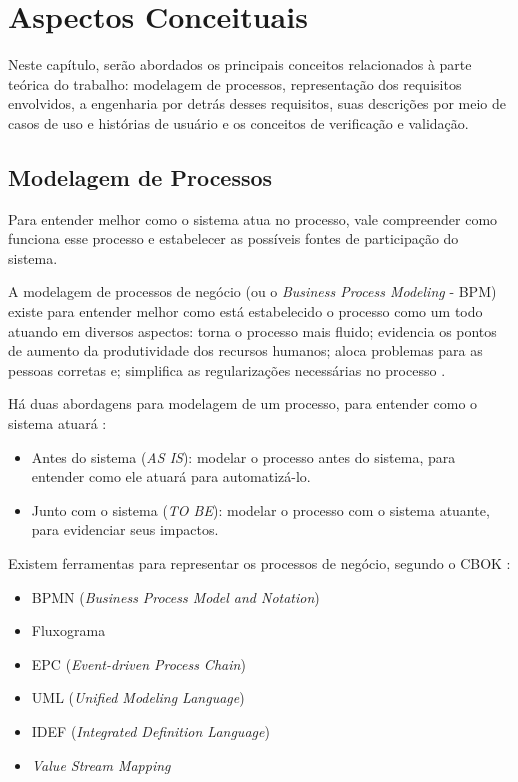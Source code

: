 \chapter{Aspectos Conceituais}\label{chap:aspectos-conceituais}
Neste capítulo, serão abordados os principais conceitos relacionados à parte teórica do trabalho: modelagem de processos, representação dos requisitos envolvidos, a engenharia por detrás desses requisitos, suas descrições por meio de casos de uso e histórias de usuário e os conceitos de verificação e validação.

\section{Modelagem de Processos}
Para entender melhor como o sistema atua no processo, vale compreender como funciona esse processo e estabelecer as possíveis fontes de participação do sistema.

A modelagem de processos de negócio (ou o \textit{Business Process Modeling} - BPM) existe para entender melhor como está estabelecido o processo como um todo atuando em diversos aspectos: torna o processo mais fluido; evidencia os pontos de aumento da produtividade dos recursos humanos; aloca problemas para as pessoas corretas e; simplifica as regularizações necessárias no processo \cite{mikehavey2015}.

Há duas abordagens para modelagem de um processo, para entender como o sistema atuará \cite{jessicaangeli2018}:

\begin{itemize}
    \item Antes do sistema (\textit{AS IS}): modelar o processo antes do sistema, para entender como ele atuará para automatizá-lo.
    \item Junto com o sistema (\textit{TO BE}): modelar o processo com o sistema atuante, para evidenciar seus impactos.
\end{itemize}

Existem ferramentas para representar os processos de negócio, segundo o CBOK \cite{cbok2013}:

\begin{itemize}
    \item BPMN (\textit{Business Process Model and Notation})
    \item Fluxograma
    \item EPC (\textit{Event-driven Process Chain})
    \item UML (\textit{Unified Modeling Language})
    \item IDEF (\textit{Integrated Definition Language})
    \item \textit{Value Stream Mapping}
\end{itemize}

